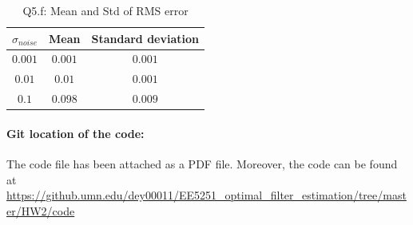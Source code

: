 \begin{table}[ht]
	\centering
	\caption{Q5.f: Mean and Std of RMS error}
	\begin{tabular}[t]{ccc} 
		\hline
		$\sigma_{noise}$ & Mean & Standard deviation\\ [0.5ex] 
		\hline
		$0.001$ & $0.001$ & $0.001$\\
		$0.01$ & $0.01$ & $0.001$\\
		$0.1$ & $0.098$ & $0.009$\\[1ex]
		\hline
	\end{tabular}
	\label{tbl:5_f_mean_std}
\end{table}
\paragraph{Git location of the code:} The code file has been attached as a PDF file. Moreover, the code can be found at\\
\url{https://github.umn.edu/dey00011/EE5251\_optimal\_filter\_estimation/tree/master/HW2/code}
